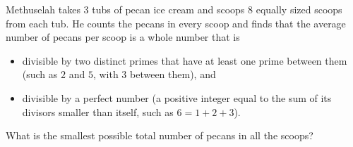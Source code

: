 Methuselah takes $3$ tubs of pecan ice cream and scoops $8$ equally sized scoops from each tub. He counts the pecans in every scoop and finds that the average number of pecans per scoop is a whole number that is
\begin{itemize}
\item divisible by two distinct primes that have at least one prime between them (such as $2$ and $5$, with $3$ between them), and
\item divisible by a perfect number (a positive integer equal to the sum of its divisors smaller than itself, such as $6=1+2+3$).
\end{itemize}
What is the smallest possible total number of pecans in all the scoops?
